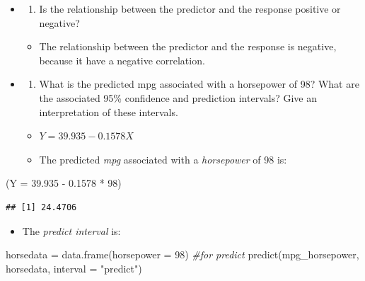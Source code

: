 \documentclass[
]{article}
\newenvironment{Shaded}{\begin{snugshade}}{\end{snugshade}}
\newcommand{\AttributeTok}[1]{\textcolor[rgb]{0.77,0.63,0.00}{#1}}
\newcommand{\CommentTok}[1]{\textcolor[rgb]{0.56,0.35,0.01}{\textit{#1}}}
\newcommand{\DecValTok}[1]{\textcolor[rgb]{0.00,0.00,0.81}{#1}}
\newcommand{\FloatTok}[1]{\textcolor[rgb]{0.00,0.00,0.81}{#1}}
\newcommand{\FunctionTok}[1]{\textcolor[rgb]{0.00,0.00,0.00}{#1}}
\newcommand{\NormalTok}[1]{#1}
\newcommand{\OtherTok}[1]{\textcolor[rgb]{0.56,0.35,0.01}{#1}}
\newcommand{\SpecialCharTok}[1]{\textcolor[rgb]{0.00,0.00,0.00}{#1}}
\newcommand{\StringTok}[1]{\textcolor[rgb]{0.31,0.60,0.02}{#1}}
\providecommand{\tightlist}{%
  \setlength{\itemsep}{0pt}\setlength{\parskip}{0pt}}
\begin{document}
\begin{itemize}
\item
  \begin{enumerate}
  \def\labelenumi{\roman{enumi}.}
  \setcounter{enumi}{2}
  \tightlist
  \item
    Is the relationship between the predictor and the response positive
    or negative?
  \end{enumerate}

  \begin{itemize}
  \tightlist
  \item
    The relationship between the predictor and the response is negative,
    because it have a negative correlation.
  \end{itemize}
\item
  \begin{enumerate}
  \def\labelenumi{\roman{enumi}.}
  \setcounter{enumi}{3}
  \tightlist
  \item
    What is the predicted mpg associated with a horsepower of 98? What
    are the associated 95\% confidence and prediction intervals? Give an
    interpretation of these intervals.
  \end{enumerate}

  \begin{itemize}
  \tightlist
  \item
    \(Y = 39.935 - 0.1578X\)
  \item
    The predicted \emph{mpg} associated with a \emph{horsepower} of 98
    is:
  \end{itemize}
\end{itemize}

\begin{Shaded}
\begin{Highlighting}[]
\NormalTok{(}\AttributeTok{Y =} \FloatTok{39.935} \SpecialCharTok{{-}} \FloatTok{0.1578} \SpecialCharTok{*} \DecValTok{98}\NormalTok{)}
\end{Highlighting}
\end{Shaded}

\begin{verbatim}
## [1] 24.4706
\end{verbatim}

\begin{itemize}
\tightlist
\item
  The \emph{predict interval} is:
\end{itemize}

\begin{Shaded}
\begin{Highlighting}[]
\NormalTok{horsedata }\OtherTok{=} \FunctionTok{data.frame}\NormalTok{(}\AttributeTok{horsepower =} \DecValTok{98}\NormalTok{)}
\CommentTok{\#for predict}
\FunctionTok{predict}\NormalTok{(mpg\_horsepower, horsedata, }\AttributeTok{interval =} \StringTok{"predict"}\NormalTok{)}
\end{Highlighting}
\end{Shaded}
\end{document}
